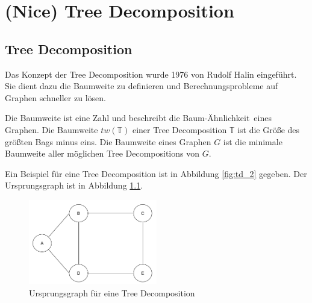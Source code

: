%
%
%
\chapter{(Nice) Tree Decomposition}
\label{c:ntd} %

\section{Tree Decomposition}
\label{sec:ntd_td}

Das Konzept der Tree Decomposition wurde 1976 von Rudolf Halin \cite{Halin1976} eingeführt. Sie dient dazu die Baumweite zu definieren und Berechnungsprobleme auf Graphen schneller zu lösen.

Die Baumweite ist eine Zahl und beschreibt die \glqq Baum-Ähnlichkeit\grqq ~eines Graphen. Die Baumweite $tw(\mathbb{T})$ einer Tree Decomposition $\mathbb{T}$ ist die Größe des größten Bags minus eins. Die Baumweite eines Graphen $G$ ist die minimale Baumweite aller möglichen Tree Decompositions von $G$.

Ein Beispiel für eine Tree Decomposition ist in Abbildung \ref{fig:td_2} gegeben. Der Ursprungsgraph ist in Abbildung \ref{fig:td_1}.

\begin{figure}
\centering
\includegraphics[width=0.5\textwidth]{./imgs/TD_1.png}
\caption{Ursprungsgraph für eine Tree Decomposition}
\label{fig:td_1}
\end{figure}

